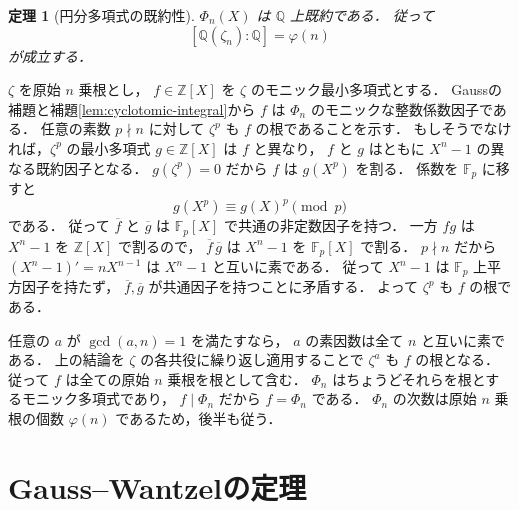 \documentclass[a5paper,10pt,onecolumn]{jsarticle}
\makeatletter
\theoremstyle{mathnotetheorem}
\newtheorem{theorem}{定理}[section]
\renewcommand{\proofname}{証明}
\renewenvironment{proof}[1][\proofname]{%
  \par\pushQED{\qed}\normalfont\topsep4\p@\@plus2\p@\relax
  \trivlist\item[\hskip\labelsep\bfseries #1]\ignorespaces
}{\popQED\endtrivlist\@endpefalse}
\makeatother
\begin{document}
\begin{theorem}[円分多項式の既約性]\label{thm:cyclotomic-irred}
$\Phi_n(X)$ は $\mathbb Q$ 上既約である．
従って
\[
 [\mathbb Q(\zeta_n):\mathbb Q]=\varphi(n)
\]
が成立する．
\end{theorem}
\begin{proof}
$\zeta$ を原始 $n$ 乗根とし，
$f\in\mathbb Z[X]$ を $\zeta$ のモニック最小多項式とする．
Gaussの補題と補題\ref{lem:cyclotomic-integral}から
$f$ は $\Phi_n$ のモニックな整数係数因子である．
任意の素数 $p\nmid n$ に対して
$\zeta^p$ も $f$ の根であることを示す．
もしそうでなければ，$\zeta^p$ の最小多項式
$g\in\mathbb Z[X]$ は $f$ と異なり，
$f$ と $g$ はともに $X^n-1$ の異なる既約因子となる．
$g(\zeta^p)=0$ だから
$f$ は $g(X^p)$ を割る．
係数を $\mathbb F_p$ に移すと
\[
 g(X^p)\equiv g(X)^p\pmod p
\]
である．
従って $\overline f$ と $\overline g$ は
$\mathbb F_p[X]$ で共通の非定数因子を持つ．
一方 $fg$ は $X^n-1$ を $\mathbb Z[X]$ で割るので，
$\overline f\,\overline g$ は
$X^n-1$ を $\mathbb F_p[X]$ で割る．
$p\nmid n$ だから
$(X^n-1)'=nX^{n-1}$ は $X^n-1$ と互いに素である．
従って $X^n-1$ は $\mathbb F_p$ 上平方因子を持たず，
$\overline f,\overline g$ が共通因子を持つことに矛盾する．
よって $\zeta^p$ も $f$ の根である．

任意の $a$ が $\gcd(a,n)=1$ を満たすなら，
$a$ の素因数は全て $n$ と互いに素である．
上の結論を $\zeta$ の各共役に繰り返し適用することで
$\zeta^a$ も $f$ の根となる．
従って $f$ は全ての原始 $n$ 乗根を根として含む．
$\Phi_n$ はちょうどそれらを根とするモニック多項式であり，
$f\mid\Phi_n$ だから $f=\Phi_n$ である．
$\Phi_n$ の次数は原始 $n$ 乗根の個数
$\varphi(n)$ であるため，後半も従う．
\end{proof}

\section{Gauss--Wantzelの定理}
\end{document}
